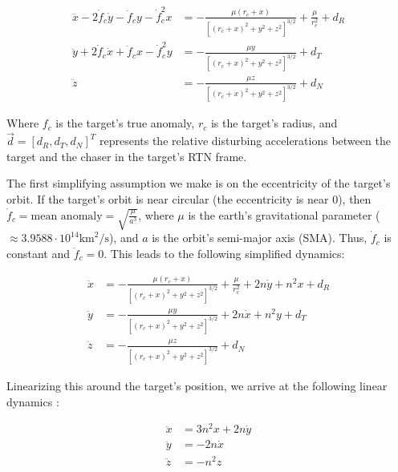 \documentclass[12pt, letterpaper,titlepage]{article}
\begin{document}
\begin{equation}
    \label{full_dynamics}
    \begin{split}
        \ddot{x} - 2\dot{f}_c\dot{y} - \ddot{f}_c y - \dot{f}_c^2 x & =
            -\frac{\mu(r_c + x)}{\left[ (r_c+x)^2 + y^2 + z^2\right]^{3/2}} +
            \frac{\mu}{r_c^2} + d_R \\
        \ddot{y} + 2\dot{f}_c\dot{x} + \ddot{f}_c x - \dot{f}_c^2 y & =
            -\frac{\mu y}{\left[ (r_c+x)^2 + y^2 + z^2\right]^{3/2}} + d_T \\
        \ddot{z} & = -\frac{\mu z}{\left[ (r_c+x)^2 + y^2 + z^2\right]^{3/2}} +
            d_N
    \end{split}
\end{equation}

Where $f_c$ is the target's true anomaly, $r_c$ is the target's radius, and
$\vec{d} = [d_R, d_T, d_N]^T$ represents the relative disturbing accelerations
between the target and the chaser in the target's RTN frame.

The first simplifying assumption we make is on the eccentricity of the target's
orbit. If the target's orbit is near circular (the eccentricity is near 0),
then $\dot{f}_c = \text{mean anomaly} = \sqrt{\frac{\mu}{a^3}}$, where $\mu$ is
the earth's gravitational parameter ($\approx 3.9588\cdot10^{14} \text{
km}^2/\text{s}$), and $a$ is the orbit's semi-major axis (SMA). Thus,
$\dot{f}_c$ is constant and $\ddot{f}_c = 0$. This leads to the following
simplified dynamics:

\begin{equation}
    \label{circular_dynamics}
    \begin{split}
        \ddot{x} & =
            -\frac{\mu(r_c + x)}{\left[ (r_c+x)^2 + y^2 + z^2\right]^{3/2}} +
            \frac{\mu}{r_c^2} + 2n\dot{y} + n^2 x + d_R \\
        \ddot{y} & = -\frac{\mu y}{\left[ (r_c+x)^2 + y^2 + z^2\right]^{3/2}} +
            2n\dot{x} + n^2 y + d_T \\
        \ddot{z} & = -\frac{\mu z}{\left[ (r_c+x)^2 + y^2 + z^2\right]^{3/2}} +
            d_N
    \end{split}
\end{equation}

Linearizing this around the target's position, we arrive at the
following linear dynamics \cite{cli_clohessy_nodate}:

\begin{equation}
    \label{linear_dynamics}
    \begin{split}
        \ddot{x} & = 3n^2 x + 2n\dot{y} \\
        \ddot{y} & = -2n\dot{x} \\
        \ddot{z} & = -n^2z
    \end{split}
\end{equation}
\end{document}
